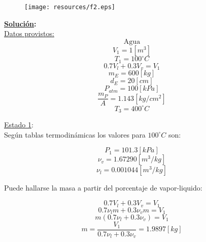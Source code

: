 \documentclass[letter,11pt]{article}
\begin{document}
\begin{enumerate}
\begin{figure}[!h]
\centering
\texttt{[image: resources/f2.eps]}
\end{figure}

\textbf{\underline{Solución}:} \\

\underline{Datos provistos:} \\

\begin{equation*}
    \text{Agua}
\end{equation*}
\begin{equation*}
    V_1=1[m^3]
\end{equation*}
\begin{equation*}
    T_1=100^\circ C
\end{equation*}
\begin{equation*}
    0.7 V_l+0.3 V_v=V_1
\end{equation*}
\begin{equation*}
    m_E=600[kg]
\end{equation*}
\begin{equation*}
    d_E=20[cm]
\end{equation*}
\begin{equation*}
    P_{atm}=100[kPa]
\end{equation*}
\begin{equation*}
    \frac{m_P}{A}=1.143[kg/cm^2]
\end{equation*}
\begin{equation*}
    T_3=400^\circ C
\end{equation*}

\underline{Estado 1}:\\
Según tablas termodinámicas los valores para $100^\circ C$ son:

\begin{equation*}
    P_1=101.3[kPa]
\end{equation*}
\begin{equation*}
    \nu_v=1.67290[m^3/kg]
\end{equation*}
\begin{equation*}
    \nu_l=0.001044[m^3/kg]
\end{equation*}

Puede hallarse la masa a partir del porcentaje de vapor-liquido:

\begin{equation*}
    0.7V_l+0.3V_v=V_1
\end{equation*}
\begin{equation*}
    0.7\nu_l m+0.3\nu_v m=V_1
\end{equation*}
\begin{equation*}
    m(0.7\nu_l+0.3\nu_v)=V_1
\end{equation*}
\begin{equation*}
    m=\frac{V_1}{0.7\nu_l+0.3\nu_v}=1.9897[kg]
\end{equation*}


\end{enumerate}
\end{document}
